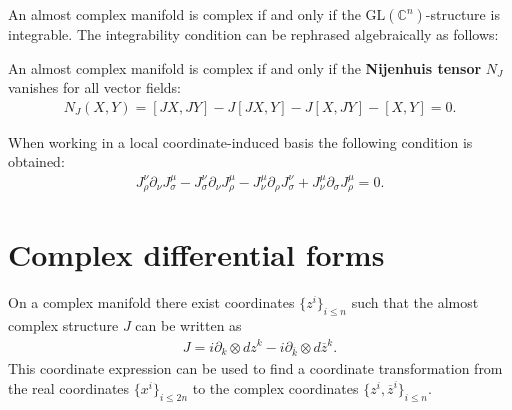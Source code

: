 
    \begin{property}
        An almost complex manifold is complex if and only if the $\text{GL}(\mathbb{C}^n)$-structure is integrable. The integrability condition can be rephrased algebraically as follows:
    \end{property}
    \begin{theorem}
        An almost complex manifold is complex if and only if the \textbf{Nijenhuis tensor} $N_J$ vanishes for all vector fields:
        \begin{gather}
            \label{complex:integrable_structure}
            N_J(X,Y) = [JX,JY] - J[JX,Y] - J[X,JY] - [X,Y] = 0.
        \end{gather}
    \end{theorem}
    When working in a local coordinate-induced basis the following condition is obtained:
    \begin{gather}
        J_\rho^\nu\partial_\nu J_\sigma^\mu - J_\sigma^\nu\partial_\nu J_\rho^\mu - J_\nu^\mu\partial_\rho J_\sigma^\nu + J_\nu^\mu\partial_\sigma J_\rho^\mu = 0.
    \end{gather}

\section{Complex differential forms}

    \begin{property}
        On a complex manifold there exist coordinates $\{z^i\}_{i\leq n}$ such that the almost complex structure $J$ can be written as
        \begin{gather}
            \label{complex:complex_structure}
            J = i\partial_k\otimes dz^k - i\partial_{\overline{k}}\otimes d\overline{z}^k.
        \end{gather}
        This coordinate expression can be used to find a coordinate transformation from the real coordinates $\{x^i\}_{i\leq2n}$ to the complex coordinates $\{z^i, \overline{z}^i\}_{i\leq n}$.
    \end{property}


